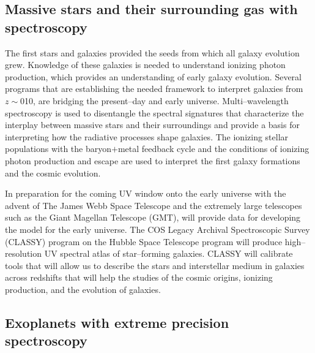 \documentclass[a4paper,openany,12pt]{book}
\begin{document}
\subsection{Massive stars and their surrounding gas with spectroscopy}

The first stars and galaxies provided the seeds from which all galaxy evolution grew. Knowledge of these galaxies is needed to understand ionizing photon production, which provides an understanding of early galaxy evolution. Several programs that are establishing the needed framework to interpret galaxies from $z\sim 0$10, are bridging the present--day and early universe. Multi--wavelength spectroscopy is used to disentangle the spectral signatures that characterize the interplay between massive stars and their surroundings and provide a basis for interpreting how the radiative processes shape galaxies. The ionizing stellar populations with the baryon$+$metal feedback cycle and the conditions of ionizing photon production and escape are used to interpret the first galaxy formations and the cosmic evolution.

In preparation for the coming UV window onto the early universe with the advent of The James Webb Space Telescope and the extremely large telescopes such as the Giant Magellan Telescope (GMT), will provide data for developing the model for the early universe. The COS Legacy Archival Spectroscopic Survey (CLASSY) program on the Hubble Space Telescope program will produce high--resolution UV spectral atlas of star--forming galaxies. CLASSY will calibrate tools that will allow us to describe the stars and interstellar medium in galaxies across redshifts that will help the studies of the cosmic origins, ionizing production, and the evolution of galaxies.

 \subsection{Exoplanets with extreme precision spectroscopy}
\end{document}
